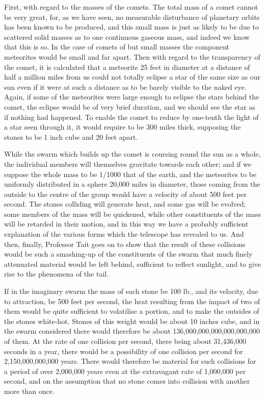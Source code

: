 \documentclass[a4paper, 12pt, oneside, polutonikogreek, english]{article}
\begin{document}
First, with regard to the masses of the comets. The total mass of a comet cannot be very great, for, as we have seen, no measurable disturbance of planetary orbits has been known to be produced, and this small mass is just as likely to be due to scattered solid masses as to one continuous gaseous mass, and indeed we know that this is so. In the case of comets of but small masses the component meteorites would be small and far apart. Then with regard to the transparency of the comet, it is calculated that a meteorite 25 feet in diameter at a distance of half a million miles from us could not totally eclipse a star of the same size as our sun even if it were at such a distance as to be barely visible to the naked eye. Again, if some of the meteorites were large enough to eclipse the stars behind the comet, the eclipse would be of very brief duration, and we should see the star as if nothing had happened. To enable the comet to reduce by one-tenth the light of a star seen through it, it would require to be 300 miles thick, supposing the stones to be 1 inch cube and 20 feet apart.

While the swarm which builds up the comet is coursing round the sun as a whole, the individual members will themselves gravitate towards each other; and if we suppose the whole mass to be 1/1000 that of the earth, and the meteorites to be uniformly distributed in a sphere 20,000 miles in diameter, those coming from the outside to the centre of the group would have a velocity of about 500 feet per second. The stones colliding will generate heat, and some gas will be evolved; some members of the mass will be quickened, while other constituents of the mass will be retarded in their motion, and in this way we have a probably sufficient explanation of the various forms which the telescope has revealed to us. And then, finally, Professor Tait goes on to show that the result of these collisions would be such a smashing-up of the constituents of the swarm that much finely attenuated material would be left behind, sufficient to reflect sunlight, and to give rise to the phenomena of the tail.

If in the imaginary swarm the mass of each stone be 100 lb., and its velocity, due to attraction, be 500 feet per second, the heat resulting from the impact of two of them would be quite sufficient to volatilise a portion, and to make the outsides of the stones white-hot. Stones of this weight would be about 10 inches cube, and in the swarm considered there would therefore be about 136,000,000,000,000,000,000 of them. At the rate of one collision per second, there being about 31,436,000 seconds in a year, there would be a possibility of one collision per second for 2,150,000,000,000 years. There would therefore be material for such collisions for a period of over 2,000,000 years even at the extravagant rate of 1,000,000 per second, and on the assumption that no stone comes into collision with another more than once.
\end{document}

